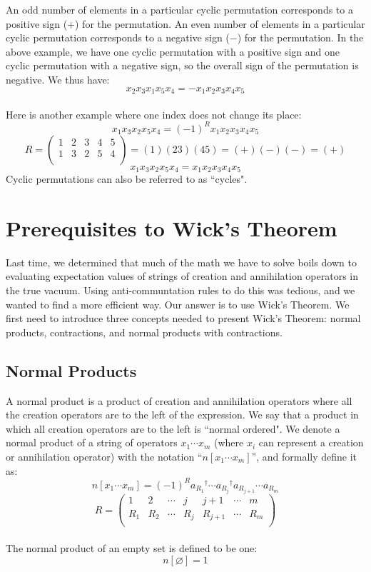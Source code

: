 \documentclass{article}
\newcommand{\dg}{\ensuremath{^\dagger} }
\newcommand{\cd}{\ensuremath{\cdots} }
\begin{document}
An odd number of elements in a particular cyclic permutation corresponds to a positive sign (+) for the permutation.
An even number of elements in a particular cyclic permutation corresponds to a negative sign ($-$) for the permutation. 
In the above example, we have one cyclic permutation with a positive sign and one cyclic permutation with a negative sign, so the overall sign of the permutation is negative.
We thus have: 
\[ x_2 x_3 x_1 x_5 x_4  = -x_1 x_2 x_3 x_4 x_5 \]
\\
Here is another example where one index does not change its place: 
\[ x_1 x_3 x_2 x_5 x_4  = (-1)^R x_1 x_2 x_3 x_4 x_5 \]
\begin{equation*}
R = 
\begin{pmatrix}
1 & 2 &3 & 4 & 5  \\
1 & 3 & 2 & 5 & 4 \\
\end{pmatrix}
= (1)(23)(45) = (+)(-)(-) = (+)
\end{equation*}
\[ x_1 x_3 x_2 x_5 x_4  =  x_1 x_2 x_3 x_4 x_5 \]
Cyclic permutations can also be referred to as ``cycles". 
\section{Prerequisites to Wick's Theorem}

Last time, we determined that much of the math we have to solve boils down to evaluating expectation values of 
strings of creation and annihilation operators in the true vacuum.
Using anti-communtation rules to do this was tedious, and we wanted to find a more efficient way. 
Our answer is to use Wick's Theorem. 
We first need to introduce three concepts needed to present Wick's Theorem: normal products, contractions, and normal products with contractions.

\subsection{Normal Products}
A normal product is a product of creation and annihilation operators where all the creation operators are to the left of the expression.
We say that a product in which all creation operators are to the left is ``normal ordered". 
We denote a normal product of a string of operators $x_1 \cd x_m$ (where $x_i$ can represent a creation or annihilation operator) with the notation ``$n[x_1 \cd x_m]$'', and formally define it as: 
\[n[x_1 \cd x_m]= (-1)^R a_{R_1}\dg \cd a_{R_j}\dg a_{R_{j+1}} \cd a_{R_m} \]
\[
R = 
\begin{pmatrix}
1 & 2 &\cd & j & j+1 & \cd & m  \\
R_1 & R_2 &\cd & R_j & R_{j+1} & \cd & R_m  \\
\end{pmatrix}
\] \\
The normal product of an empty set is defined to be one:
\[ n[\varnothing] = 1\]
\end{document}
